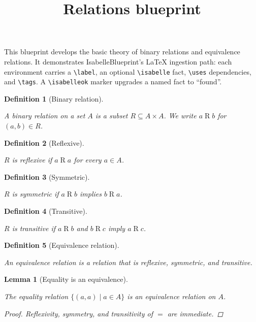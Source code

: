 \documentclass{article}
\newtheorem{definition}{Definition}
\newtheorem{lemma}{Lemma}
\newcommand{\isabelle}[1]{}
\newcommand{\isabelleok}{}
\newcommand{\uses}[1]{}
\newcommand{\tags}[1]{}
\begin{document}
\title{Relations blueprint}
\maketitle

This blueprint develops the basic theory of binary relations and
equivalence relations. It demonstrates IsabelleBlueprint's LaTeX
ingestion path: each environment carries a \verb|\label|, an optional
\verb|\isabelle| fact, \verb|\uses| dependencies, and \verb|\tags|.
A \verb|\isabelleok| marker upgrades a named fact to ``found''.

\begin{definition}[Binary relation]
\label{relation}
\isabelle{Relations.relation_def}
\isabelleok
\tags{foundations}
A \emph{binary relation} on a set $A$ is a subset $R \subseteq A \times A$.
We write $a \mathrel{R} b$ for $(a, b) \in R$.
\end{definition}

\begin{definition}[Reflexive]
\label{reflexive}
\isabelle{Relations.reflexive_def}
\isabelleok
\uses{relation}
\tags{properties}
$R$ is \emph{reflexive} if $a \mathrel{R} a$ for every $a \in A$.
\end{definition}

\begin{definition}[Symmetric]
\label{symmetric}
\isabelle{Relations.symmetric_def}
\isabelleok
\uses{relation}
\tags{properties}
$R$ is \emph{symmetric} if $a \mathrel{R} b$ implies $b \mathrel{R} a$.
\end{definition}

\begin{definition}[Transitive]
\label{transitive}
\isabelle{Relations.transitive_def}
\uses{relation}
\tags{properties}
$R$ is \emph{transitive} if $a \mathrel{R} b$ and $b \mathrel{R} c$
imply $a \mathrel{R} c$.
\end{definition}

\begin{definition}[Equivalence relation]
\label{equivalence}
\isabelle{Relations.equivalence_def}
\uses{reflexive, symmetric, transitive}
\tags{foundations}
An \emph{equivalence relation} is a relation that is reflexive,
symmetric, and transitive.
\end{definition}

\begin{lemma}[Equality is an equivalence]
\label{eq-equivalence}
\isabelle{Relations.eq_equivalence}
\isabelleok
\uses{equivalence}
\tags{examples}
The equality relation $\{(a, a) \mid a \in A\}$ is an equivalence
relation on $A$.
\begin{proof}
Reflexivity, symmetry, and transitivity of $=$ are immediate.
\end{proof}
\end{lemma}
\end{document}
